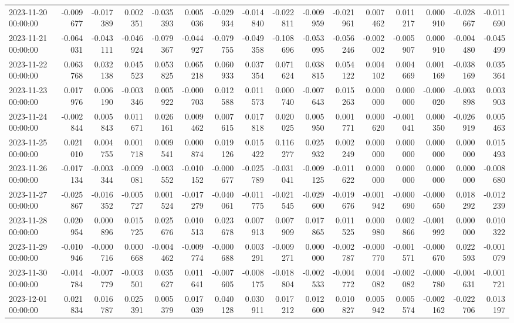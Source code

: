 \begin{tabular}{lrrrrrrrrrrrrrrr}
2023-11-20 00:00:00 & -0.009677 & -0.017389 & 0.002351 & -0.035393 & 0.005036 & -0.029934 & -0.014840 & -0.022811 & -0.009959 & -0.021961 & 0.007462 & 0.011217 & 0.000910 & -0.028667 & -0.011690 \\
2023-11-21 00:00:00 & -0.064031 & -0.043111 & -0.046924 & -0.079367 & -0.044927 & -0.079755 & -0.049358 & -0.108696 & -0.053095 & -0.056246 & -0.002002 & -0.005907 & 0.000910 & -0.004480 & -0.045499 \\
2023-11-22 00:00:00 & 0.063768 & 0.032138 & 0.045523 & 0.053825 & 0.065218 & 0.060933 & 0.037354 & 0.071624 & 0.038815 & 0.054122 & 0.004102 & 0.004669 & 0.001169 & -0.038169 & 0.035364 \\
2023-11-23 00:00:00 & 0.017976 & 0.006190 & -0.003346 & 0.005922 & -0.000703 & 0.012588 & 0.011573 & 0.000740 & -0.007643 & 0.015263 & 0.000000 & 0.000000 & -0.000020 & -0.003898 & 0.003903 \\
2023-11-24 00:00:00 & -0.002844 & 0.005843 & 0.011671 & 0.026161 & 0.009462 & 0.007615 & 0.017818 & 0.020025 & 0.005950 & 0.001771 & 0.000620 & -0.001041 & 0.000350 & -0.026919 & 0.005463 \\
2023-11-25 00:00:00 & 0.021010 & 0.004755 & 0.001718 & 0.009541 & 0.000874 & 0.019126 & 0.015422 & 0.116277 & 0.025932 & 0.002249 & 0.000000 & 0.000000 & 0.000000 & 0.000000 & 0.015493 \\
2023-11-26 00:00:00 & -0.017134 & -0.003344 & -0.009081 & -0.003552 & -0.010152 & -0.000677 & -0.025789 & -0.031041 & -0.009125 & -0.011622 & 0.000000 & 0.000000 & 0.000000 & 0.000000 & -0.008680 \\
2023-11-27 00:00:00 & -0.025867 & -0.016352 & -0.005727 & 0.001524 & -0.017279 & -0.040061 & -0.011775 & -0.021545 & -0.029600 & -0.019676 & -0.001942 & -0.000690 & -0.000650 & 0.018292 & -0.012239 \\
2023-11-28 00:00:00 & 0.020954 & 0.000896 & 0.015725 & 0.025676 & 0.010513 & 0.023678 & 0.007913 & 0.007909 & 0.017865 & 0.011525 & 0.000980 & 0.002866 & -0.001992 & 0.000000 & 0.010322 \\
2023-11-29 00:00:00 & -0.010946 & -0.000716 & 0.000668 & -0.004462 & -0.009774 & -0.000688 & 0.003291 & -0.009271 & 0.000000 & -0.002787 & -0.000770 & -0.001571 & -0.000670 & 0.022593 & -0.001079 \\
2023-11-30 00:00:00 & -0.014784 & -0.007779 & -0.003501 & 0.035627 & 0.011641 & -0.007605 & -0.008175 & -0.018804 & -0.002533 & -0.004772 & 0.004082 & -0.002082 & -0.000780 & -0.004631 & -0.001721 \\
2023-12-01 00:00:00 & 0.021834 & 0.016787 & 0.025391 & 0.005379 & 0.017039 & 0.040128 & 0.030911 & 0.017212 & 0.012600 & 0.010827 & 0.005942 & 0.005574 & -0.002162 & -0.022706 & 0.013197 \\

\end{tabular}
